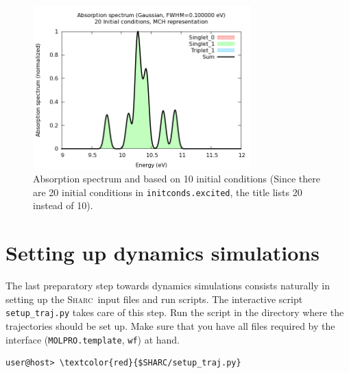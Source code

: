 \documentclass[a4paper,11pt,DIV=15,openany]{scrbook}
\newcommand{\sharc}{\textsc{Sharc}}
\newcommand{\ttt}[1]{\texttt{#1}}
\begin{document}
\begin{figure}[h]
  \centering
  \includegraphics[width=0.75\textwidth]{figures/spectrum.png}
  \caption{Absorption spectrum and based on 10 initial conditions (Since there are 20 initial conditions in \ttt{initconds.excited}, the title lists 20 instead of 10).}
  \label{fig:spectrum}
\end{figure}











\clearpage
\section{Setting up dynamics simulations}

The last preparatory step towards dynamics simulations consists naturally in setting up the \sharc\ input files and run scripts. The interactive script \ttt{setup\_traj.py} takes care of this step. Run the script in the directory where the trajectories should be set up. Make sure that you have all files required by the interface (\ttt{MOLPRO.template}, \ttt{wf}) at hand.
\begin{Verbatim}[commandchars=\\\{\}]
user@host> \textcolor{red}{$SHARC/setup_traj.py}
\end{Verbatim}
\end{document}
